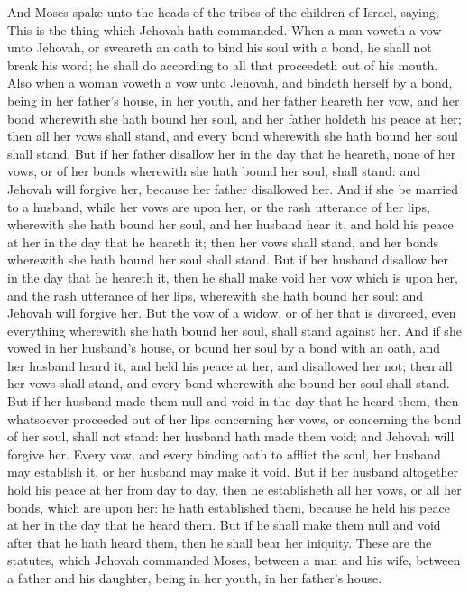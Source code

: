 And Moses spake unto the heads of the tribes of the children of Israel, saying, This is the thing which Jehovah hath commanded. When a man voweth a vow unto Jehovah, or sweareth an oath to bind his soul with a bond, he shall not break his word; he shall do according to all that proceedeth out of his mouth. Also when a woman voweth a vow unto Jehovah, and bindeth herself by a bond, being in her father’s house, in her youth, and her father heareth her vow, and her bond wherewith she hath bound her soul, and her father holdeth his peace at her; then all her vows shall stand, and every bond wherewith she hath bound her soul shall stand. But if her father disallow her in the day that he heareth, none of her vows, or of her bonds wherewith she hath bound her soul, shall stand: and Jehovah will forgive her, because her father disallowed her.  And if she be married to a husband, while her vows are upon her, or the rash utterance of her lips, wherewith she hath bound her soul, and her husband hear it, and hold his peace at her in the day that he heareth it; then her vows shall stand, and her bonds wherewith she hath bound her soul shall stand. But if her husband disallow her in the day that he heareth it, then he shall make void her vow which is upon her, and the rash utterance of her lips, wherewith she hath bound her soul: and Jehovah will forgive her.  But the vow of a widow, or of her that is divorced, even everything wherewith she hath bound her soul, shall stand against her. And if she vowed in her husband’s house, or bound her soul by a bond with an oath, and her husband heard it, and held his peace at her, and disallowed her not; then all her vows shall stand, and every bond wherewith she bound her soul shall stand. But if her husband made them null and void in the day that he heard them, then whatsoever proceeded out of her lips concerning her vows, or concerning the bond of her soul, shall not stand: her husband hath made them void; and Jehovah will forgive her.  Every vow, and every binding oath to afflict the soul, her husband may establish it, or her husband may make it void. But if her husband altogether hold his peace at her from day to day, then he establisheth all her vows, or all her bonds, which are upon her: he hath established them, because he held his peace at her in the day that he heard them. But if he shall make them null and void after that he hath heard them, then he shall bear her iniquity. These are the statutes, which Jehovah commanded Moses, between a man and his wife, between a father and his daughter, being in her youth, in her father’s house. 

